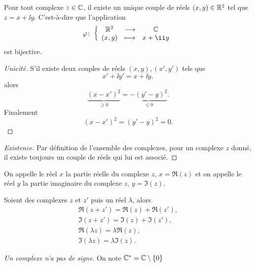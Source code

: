 %
\begin{prop} 
  Pour tout complexe $z \in \mathbb{C}$, il existe un unique couple de réels $(x,y) \in \mathbb{R}^2$ tel que $z=x+\ii y$. C'est-à-dire que l'application  
  \begin{equation}
    \fonction{\varphi}{\R^2}{\C}{(x,y)}{x+\ii y}
  \end{equation}
  est bijective.
\end{prop}
\begin{proof}[Unicité]
  S'il existe deux couples de réels $(x,y),(x',y')$ tels que 
  \begin{equation}
    x'+\ii y'=x +\ii y,
  \end{equation}
  alors
  \begin{equation}
    \underbrace{(x-x')^2}_{\geq 0}=\underbrace{-(y'-y)^2}_{\leq 0}.
  \end{equation}
  Finalement
  \begin{equation}
    (x-x')^2=(y'-y)^2=0.
  \end{equation}
\end{proof}
\begin{proof}[Existence]
  Par définition de l'ensemble des complexes, pour un complexe $z$ donné, il existe toujours un couple de réels qui lui est associé.
\end{proof}
%
On appelle le réel $x$ la partie réelle du complexe $z$, $x=\Re(z)$ et on appelle le réel $y$ la partie imaginaire du complexe $z$, $y=\Im(z)$.
%
\begin{prop}
  Soient des complexes $z$ et $z'$ puis un réel $\lambda$, alors
  \begin{gather}
    \Re(z+z')=\Re(z)+\Re(z'), \\ 
    \Im(z+z')=\Im(z)+\Im(z'),\\
    \Re(\lambda z)=\lambda \Re(z),\\ 
    \Im(\lambda z)=\lambda \Im(z).
  \end{gather}
\end{prop}
%
\emph{Un complexe n'a pas de signe}. On note $\mathbb{C}^*=\mathbb{C} \setminus \{0\}$
%
